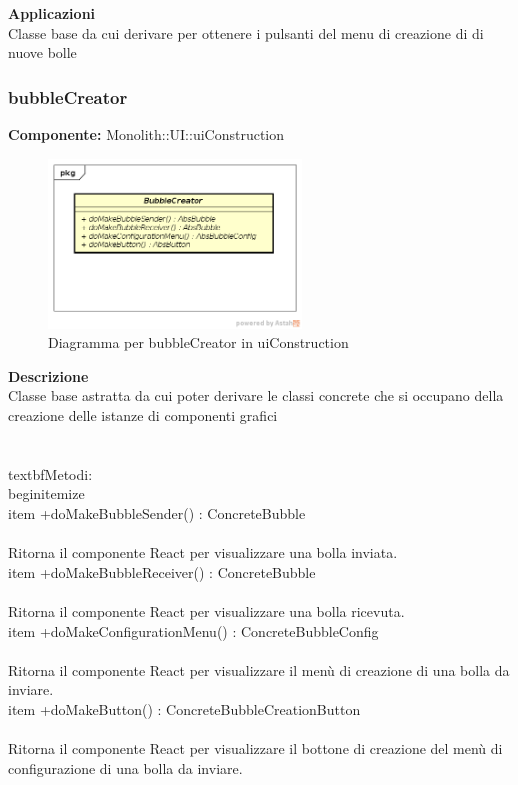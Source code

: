 \textbf{Applicazioni}\\
Classe base da cui derivare per ottenere i pulsanti del menu di creazione di di nuove bolle 


\clearpage

\subsubsection{bubbleCreator}
\textbf{Componente:}  Monolith::UI::uiConstruction\\
   \FloatBarrier
   \begin{figure}[ht]
   \centering
   \includegraphics[width=0.6\textwidth]{img/single-bubbleCreator}
   \caption{{Diagramma per bubbleCreator in uiConstruction}}
\end{figure}
\FloatBarrier
\textbf{Descrizione}\\
Classe base astratta da cui poter derivare le classi concrete che si occupano della creazione delle istanze  di componenti grafici  \\\\ 
\\textbf{Metodi:}
\\begin{itemize}
\\item +doMakeBubbleSender() : ConcreteBubble 
\\\\
Ritorna il componente React per visualizzare una bolla inviata.
\\item +doMakeBubbleReceiver() : ConcreteBubble 
\\\\ 
Ritorna il componente React per visualizzare una bolla ricevuta.
\\item +doMakeConfigurationMenu() : ConcreteBubbleConfig 
\\\\
Ritorna il componente React per visualizzare il menù di creazione di una bolla da inviare.
\\item +doMakeButton() : ConcreteBubbleCreationButton 
\\\\ 
Ritorna il componente React per visualizzare il bottone di creazione del menù di configurazione di una bolla da inviare.

